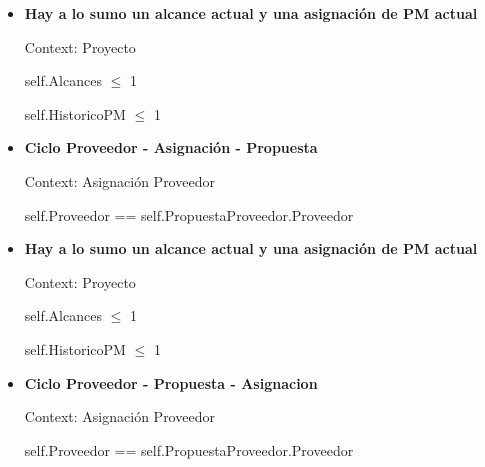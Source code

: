\begin{itemize}
	\item \textbf{Hay a lo sumo un alcance actual y una asignación de PM actual}
	
			Context: Proyecto
			
			self.Alcances $\leq$ 1
			
			self.HistoricoPM $\leq$ 1
			
	\item \textbf{Ciclo Proveedor - Asignaci\'on - Propuesta}
	
			Context: Asignación Proveedor
			
			self.Proveedor == self.PropuestaProveedor.Proveedor
	
	
        \item \textbf{Hay a lo sumo un alcance actual y una asignación de PM actual}
    
            Context: Proyecto
            
            self.Alcances $\leq$ 1
            
            self.HistoricoPM $\leq$ 1
    
    \item \textbf{Ciclo Proveedor - Propuesta - Asignacion}
    
            Context: Asignación Proveedor
            
            self.Proveedor == self.PropuestaProveedor.Proveedor
        
\end{itemize}
